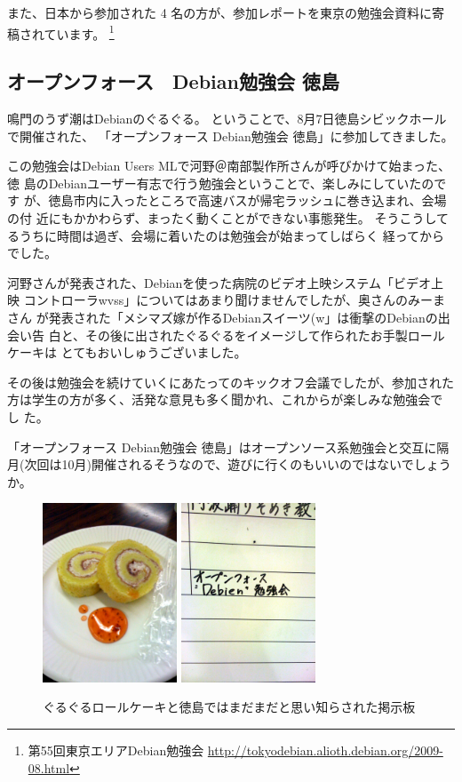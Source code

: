 \documentclass[mingoth,a4paper]{jsarticle}
\begin{document}
また、日本から参加された 4 名の方が、参加レポートを東京の勉強会資料に寄稿されています。
\footnote{第55回東京エリアDebian勉強会 \url{http://tokyodebian.alioth.debian.org/2009-08.html}}

\subsection{オープンフォース　Debian勉強会 徳島}
鳴門のうず潮はDebianのぐるぐる。
ということで、8月7日徳島シビックホールで開催された、
「オープンフォース Debian勉強会 徳島」に参加してきました。

この勉強会はDebian Users MLで河野＠南部製作所さんが呼びかけて始まった、徳
島のDebianユーザー有志で行う勉強会ということで、楽しみにしていたのです
が、徳島市内に入ったところで高速バスが帰宅ラッシュに巻き込まれ、会場の付
近にもかかわらず、まったく動くことができない事態発生。
そうこうしてるうちに時間は過ぎ、会場に着いたのは勉強会が始まってしばらく
経ってからでした。

河野さんが発表された、Debianを使った病院のビデオ上映システム「ビデオ上映
コントローラwvss」についてはあまり聞けませんでしたが、奥さんのみーまさん
が発表された「メシマズ嫁が作るDebianスイーツ(w」は衝撃のDebianの出会い告
白と、その後に出されたぐるぐるをイメージして作られたお手製ロールケーキは
とてもおいしゅうございました。

その後は勉強会を続けていくにあたってのキックオフ会議でしたが、参加された
方は学生の方が多く、活発な意見も多く聞かれ、これからが楽しみな勉強会でし
た。

「オープンフォース Debian勉強会 徳島」はオープンソース系勉強会と交互に隔
月(次回は10月)開催されるそうなので、遊びに行くのもいいのではないでしょう
か。

\begin{figure}[h]
 \includegraphics[width=4cm]{image200908/kansai-event-tokushima01.jpg}
 \includegraphics[width=4cm]{image200908/kansai-event-tokushima00.jpg}
\caption{ぐるぐるロールケーキと徳島ではまだまだと思い知らされた掲示板}
\end{figure}
\end{document}

